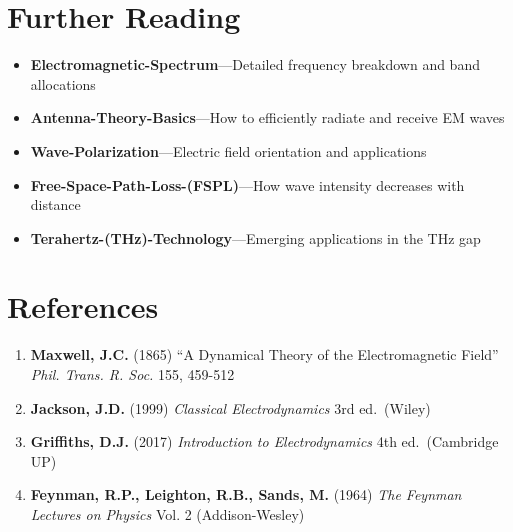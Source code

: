 \section{Further Reading}

\begin{itemize}
\item \textbf{Electromagnetic-Spectrum}---Detailed frequency breakdown and band allocations
\item \textbf{Antenna-Theory-Basics}---How to efficiently radiate and receive EM waves
\item \textbf{Wave-Polarization}---Electric field orientation and applications
\item \textbf{Free-Space-Path-Loss-(FSPL)}---How wave intensity decreases with distance
\item \textbf{Terahertz-(THz)-Technology}---Emerging applications in the THz gap
\end{itemize}

\section{References}

\begin{enumerate}
\def\labelenumi{\arabic{enumi}.}
\tightlist
\item
  \textbf{Maxwell, J.C.} (1865) ``A Dynamical Theory of the
  Electromagnetic Field'' \emph{Phil. Trans. R. Soc.} 155, 459-512
\item
  \textbf{Jackson, J.D.} (1999) \emph{Classical Electrodynamics} 3rd
  ed.~(Wiley)
\item
  \textbf{Griffiths, D.J.} (2017) \emph{Introduction to Electrodynamics}
  4th ed.~(Cambridge UP)
\item
  \textbf{Feynman, R.P., Leighton, R.B., Sands, M.} (1964) \emph{The
  Feynman Lectures on Physics} Vol. 2 (Addison-Wesley)
\end{enumerate}
